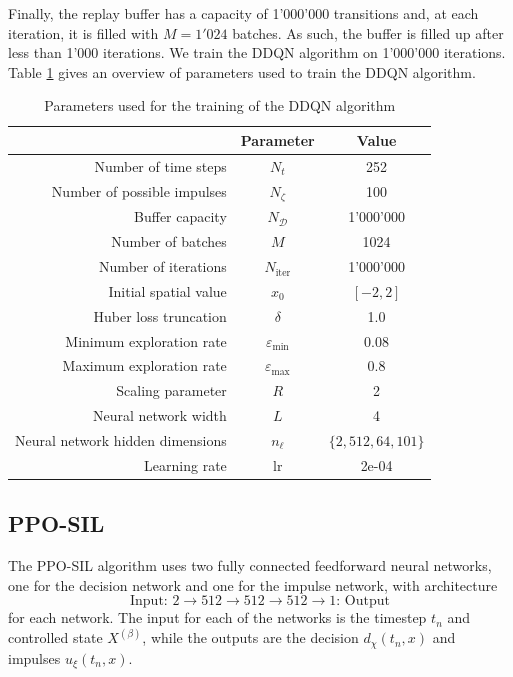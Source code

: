 Finally, the replay buffer has a capacity of 1'000'000 transitions and, at each iteration, it is filled with $M=1'024$ batches. As such, the buffer is filled up after less than 1'000 iterations. We train the DDQN algorithm on 1'000'000 iterations. Table \ref{tab: DDQN training parameters} gives an overview of parameters used to train the DDQN algorithm.
\begin{table}[h]
    \centering
    \begin{tabular}{rcc}
        \toprule
        & Parameter & Value \\
        \hline
        Number of time steps & $N_t$ & 252 \\
        Number of possible impulses & $N_\zeta$ & 100 \\
        Buffer capacity & $N_\mathcal{D}$ & 1'000'000\\
        Number of batches & $M$ & 1024 \\
        Number of iterations & $N_{\text{iter}}$ & 1'000'000 \\
        Initial spatial value & $x_0$ & $[-2,2]$ \\
        Huber loss truncation & $\delta$ & 1.0 \\
        Minimum exploration rate & $\varepsilon_{\min} $ & 0.08 \\
        Maximum exploration rate & $\varepsilon_{\max}$ & 0.8 \\
        Scaling parameter & $R$ & 2 \\
        Neural network width & $L$ & 4 \\
        Neural network hidden dimensions & $n_\ell$ & $\{2, 512, 64, 101\}$ \\
        Learning rate & lr & 2e-04 \\
        \toprule
    \end{tabular}
    \caption{Parameters used for the training of the DDQN algorithm}
    \label{tab: DDQN training parameters}
\end{table}

\subsection{PPO-SIL}
The PPO-SIL algorithm uses two fully connected feedforward neural networks, one for the decision network and one for the impulse network, with architecture
\begin{equation*}
    \text{Input: }2 \rightarrow 512 \rightarrow 512 \rightarrow 512 \rightarrow 1 \text{: Output}
\end{equation*}
for each network. The input for each of the networks is the timestep $t_n$ and controlled state $X^{(\beta)}$, while the outputs are the decision $d_\chi(t_n,x)$ and impulses $u_\xi(t_n,x)$.

